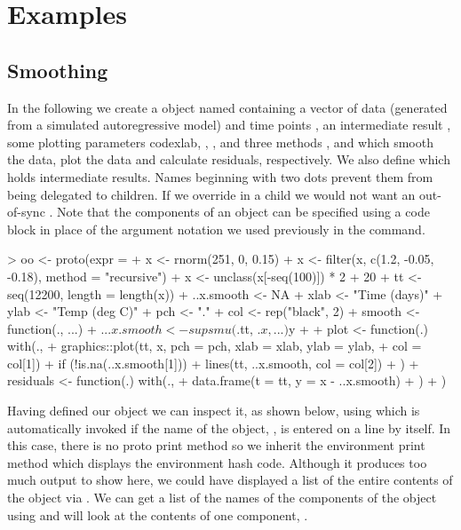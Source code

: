 \documentclass{Z}
\begin{document}
\section{Examples} \label{sec:examples}

\subsection{Smoothing}

In the following we create a  object named 
containing a vector of data  (generated from a simulated
autoregressive model) and time points
, an intermediate result
, some plotting parameters code{xlab}, ,
,  and three methods , 
and  which smooth the data, plot the data and
calculate residuals, respectively.  We also define 
which holds intermediate results.  Names beginning with two dots
prevent them from being delegated to children.  If we override
 in a child we would not want an out-of-sync .
Note that the components of an object can be specified using a code
block in place of the argument notation we used previously in the
 command.

\begin{Schunk}
\begin{Sinput}
> oo <- proto(expr = {
+     x <- rnorm(251, 0, 0.15)
+     x <- filter(x, c(1.2, -0.05, -0.18), method = "recursive")
+     x <- unclass(x[-seq(100)]) * 2 + 20
+     tt <- seq(12200, length = length(x))
+     ..x.smooth <- NA
+     xlab <- "Time (days)"
+     ylab <- "Temp (deg C)"
+     pch <- "."
+     col <- rep("black", 2)
+     smooth <- function(., ...) {
+         .$..x.smooth <- supsmu(.$tt, .$x, ...)$y
+     }
+     plot <- function(.) with(., {
+         graphics::plot(tt, x, pch = pch, xlab = xlab, ylab = ylab, 
+             col = col[1])
+         if (!is.na(..x.smooth[1])) 
+             lines(tt, ..x.smooth, col = col[2])
+     })
+     residuals <- function(.) with(., {
+         data.frame(t = tt, y = x - ..x.smooth)
+     })
+ })
\end{Sinput}
\end{Schunk}

Having defined our  object we can inspect it, as shown
below, using 
 which is automatically invoked if the
name of the object, , is entered on a line by itself.  
In this case, there is no proto print method so we inherit the
environment print method which displays the environment hash code.  
Although it produces too much output to show here,
we could have displayed a 
list of the entire contents of the object 
via .
We can get a list of the names of the 
components of the object using  and will look
at the contents of one component, .
\end{document}
